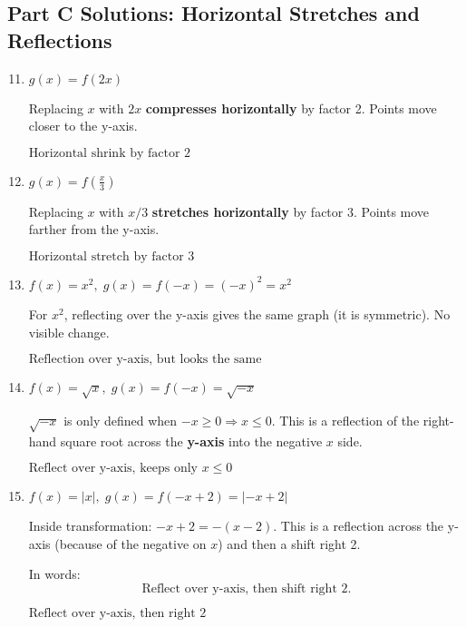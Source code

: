 \documentclass[12pt]{article}
\begin{document}
\subsection*{Part C Solutions: Horizontal Stretches and Reflections}
\begin{enumerate}
  \setcounter{enumi}{10}
  \item \(g(x) = f(2x)\)

  Replacing \(x\) with \(2x\) \textbf{compresses horizontally} by factor 2. Points move closer to the y-axis.

  \(\boxed{\text{Horizontal shrink by factor 2}}\)

  \item \(g(x) = f\left(\frac{x}{3}\right)\)

  Replacing \(x\) with \(x/3\) \textbf{stretches horizontally} by factor 3. Points move farther from the y-axis.

  \(\boxed{\text{Horizontal stretch by factor 3}}\)

  \item \(f(x) = x^2,\; g(x) = f(-x) = (-x)^2 = x^2\)

  For \(x^2\), reflecting over the y-axis gives the same graph (it is symmetric). No visible change.

  \(\boxed{\text{Reflection over y-axis, but looks the same}}\)

  \item \(f(x) = \sqrt{x},\; g(x) = f(-x) = \sqrt{-x}\)

  \(\sqrt{-x}\) is only defined when \(-x \ge 0 \Rightarrow x \le 0.\)  
  This is a reflection of the right-hand square root across the \textbf{y-axis} into the negative \(x\) side.

  \(\boxed{\text{Reflect over y-axis, keeps only } x \le 0}\)

  \item \(f(x) = |x|,\; g(x) = f(-x + 2) = |-x + 2|\)

  Inside transformation: \(-x + 2 = -(x - 2)\).  
  This is a reflection across the y-axis (because of the negative on \(x\)) and then a shift right 2.

  In words:
  \[
  \text{Reflect over y-axis, then shift right 2.}
  \]

  \(\boxed{\text{Reflect over y-axis, then right 2}}\)
\end{enumerate}
\end{document}

